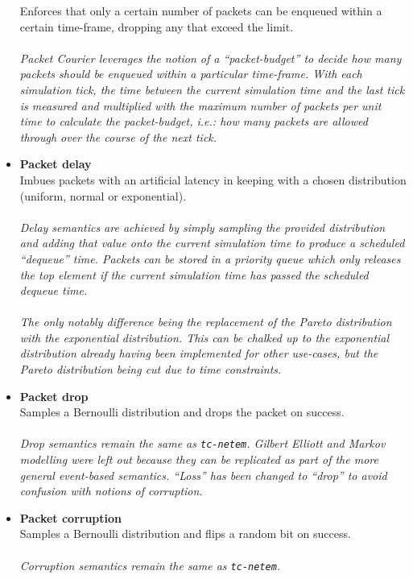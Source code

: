 \begin{itemize}
    Enforces that only a certain number of packets can be enqueued within a certain time-frame, dropping any that
    exceed the limit. \\ \\
    \emph{Packet Courier leverages the notion of a ``packet-budget'' to decide how many packets should be enqueued
    within a particular time-frame. With each simulation tick, the time between the current simulation time and the
    last tick is measured and multiplied with the maximum number of packets per unit time to calculate the
    packet-budget, i.e.: how many packets are allowed through over the course of the next tick.}
    \item \textbf{Packet delay} \\
    Imbues packets with an artificial latency in keeping with a chosen distribution (uniform, normal or exponential).
    \\ \\
    \emph{Delay semantics are achieved by simply sampling the provided distribution and adding that value onto the
    current simulation time to produce a scheduled ``dequeue'' time. Packets can be stored in a priority queue which
    only releases the top element if the current simulation time has passed the scheduled dequeue time. \\ \\
    The only notably difference being the replacement of the Pareto distribution with the exponential distribution.
    This can be chalked up to the exponential distribution already having been implemented for other use-cases, but
    the Pareto distribution being cut due to time constraints.}
    \item \textbf{Packet drop} \\
    Samples a Bernoulli distribution and drops the packet on success. \\ \\
    \emph{Drop semantics remain the same as \texttt{tc-netem}. Gilbert Elliott and Markov modelling were left out
    because they can be replicated as part of the more general event-based semantics. ``Loss'' has been changed to
    ``drop'' to avoid confusion with notions of corruption.}
    \item \textbf{Packet corruption} \\
    Samples a Bernoulli distribution and flips a random bit on success.\\ \\
    \emph{Corruption semantics remain the same as \texttt{tc-netem}.}

\end{itemize}
